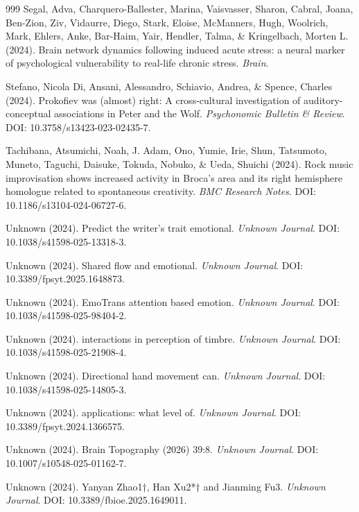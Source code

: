 \documentclass[9pt,onecolumn]{article}
\begin{document}
\begin{thebibliography}{999}
Segal, Adva, Charquero-Ballester, Marina, Vaisvasser, Sharon, Cabral, Joana, Ben-Zion, Ziv, Vidaurre, Diego, Stark, Eloise, McManners, Hugh, Woolrich, Mark, Ehlers, Anke, Bar-Haim, Yair, Hendler, Talma, \& Kringelbach, Morten L. (2024). Brain network dynamics following induced acute stress: a neural marker of psychological vulnerability to real-life chronic stress. \textit{Brain}.

Stefano, Nicola Di, Ansani, Alessandro, Schiavio, Andrea, \& Spence, Charles (2024). Prokofiev was (almost) right: A cross-cultural investigation of auditory-conceptual associations in Peter and the Wolf. \textit{Psychonomic Bulletin \& Review}. DOI: 10.3758/s13423-023-02435-7.

Tachibana, Atsumichi, Noah, J. Adam, Ono, Yumie, Irie, Shun, Tatsumoto, Muneto, Taguchi, Daisuke, Tokuda, Nobuko, \& Ueda, Shuichi (2024). Rock music improvisation shows increased activity in Broca's area and its right hemisphere homologue related to spontaneous creativity. \textit{BMC Research Notes}. DOI: 10.1186/s13104-024-06727-6.

Unknown (2024). Predict the writer’s trait emotional. \textit{Unknown Journal}. DOI: 10.1038/s41598-025-13318-3.

Unknown (2024). Shared ﬂow and emotional. \textit{Unknown Journal}. DOI: 10.3389/fpsyt.2025.1648873.

Unknown (2024). EmoTrans attention based emotion. \textit{Unknown Journal}. DOI: 10.1038/s41598-025-98404-2.

Unknown (2024). interactions in perception of timbre. \textit{Unknown Journal}. DOI: 10.1038/s41598-025-21908-4.

Unknown (2024). Directional hand movement can. \textit{Unknown Journal}. DOI: 10.1038/s41598-025-14805-3.

Unknown (2024). applications: what level of. \textit{Unknown Journal}. DOI: 10.3389/fpsyt.2024.1366575.

Unknown (2024). Brain Topography (2026) 39:8. \textit{Unknown Journal}. DOI: 10.1007/s10548-025-01162-7.

Unknown (2024). Yanyan Zhao1†, Han Xu2*† and Jianming Fu3. \textit{Unknown Journal}. DOI: 10.3389/fbioe.2025.1649011.


\end{thebibliography}
\end{document}
